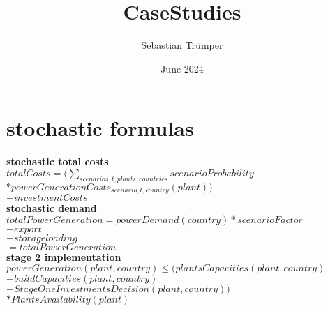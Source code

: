 \documentclass{article}
\title{CaseStudies}
\author{Sebastian Trümper}
\date{June 2024}
\begin{document}
\maketitle

\section{stochastic formulas}
\textbf{stochastic total costs}\\
$totalCosts = \big(\sum_{scenarios, t, plants, countries} scenarioProbability $\\
\quad\quad\quad\quad\quad\quad $* powerGenerationCosts_{scenario, t, country}(plant)\big)$\\
\quad\quad\quad\quad\quad\quad$ + investmentCosts$\\


\textbf{stochastic demand}\\
$totalPowerGeneration = powerDemand(country)*scenarioFactor  $\\
\quad\quad\quad\quad\quad\quad\quad\quad\quad\quad\quad$+ export $\\
\quad\quad\quad\quad\quad\quad\quad\quad\quad\quad\quad$ + storageloading$\\

$ = totalPowerGeneration$\\


\textbf{stage 2 implementation}\\
$powerGeneration(plant,country) \leq \big(plantsCapacities(plant, country) $\\
\quad\quad\quad\quad\quad\quad\quad\quad\quad\quad\quad\quad\quad\quad\quad$+ buildCapacities(plant, country)$\\
\quad\quad\quad\quad\quad\quad\quad\quad\quad\quad\quad\quad\quad\quad\quad$+ StageOneInvestmentsDecision(plant, country)\big)$\\
\quad\quad\quad\quad\quad\quad\quad\quad\quad\quad\quad\quad\quad\quad\quad$* PlantsAvailability(plant)$\\
\end{document}
